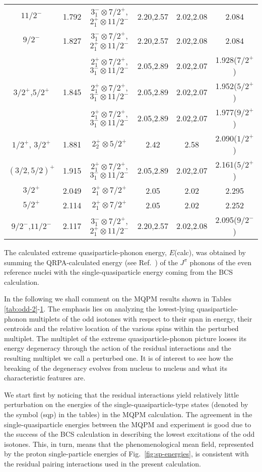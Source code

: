 \begin{table}[htbp]
\begin{center}
\begin{tabular}{cc|ccc|c}
$11/2^{-}$ & 1.792 & $3^-_1\otimes 7/2^+$, $2^+_1\otimes 11/2^-$ 
& 2.20,2.57 & 2.02,2.08 & 2.084 \\
$9/2^{-}$ & 1.827 & $3^-_1\otimes 7/2^+$, $2^+_1\otimes 11/2^-$ 
& 2.20,2.57 & 2.02,2.08 & 2.084 \\
& & $2^+_1\otimes 7/2^+$, $3^-_1\otimes 11/2^-$ 
& 2.05,2.89 & 2.02,2.07 & 1.928($7/2^+$) \\
$3/2^{+}$,$5/2^{+}$ & 1.845 & $2^+_1\otimes 7/2^+$, $3^-_1\otimes 11/2^-$ 
& 2.05,2.89 & 2.02,2.07 & 1.952($5/2^+$) \\
& & $2^+_1\otimes 7/2^+$, $3^-_1\otimes 11/2^-$ 
& 2.05,2.89 & 2.02,2.07 & 1.977($9/2^+$) \\
$1/2^{+}$, $3/2^{+}$ & 1.881 & $2^+_2\otimes 5/2^+$ & 2.42 & 2.58 & 
2.090($1/2^+$) \\
$(3/2,5/2)^{+}$ & 1.915 & $2^+_1\otimes 7/2^+$, $3^-_1\otimes 11/2^-$ 
& 2.05,2.89 & 2.02,2.07 & 2.161($5/2^+$) \\
$3/2^{+}$ & 2.049 & $2^+_1\otimes 7/2^+$ & 2.05 & 2.02 & 2.295 \\
$5/2^{+}$ & 2.114 & $2^+_1\otimes 7/2^+$ & 2.05 & 2.02 & 2.252 \\
$9/2^{-}$,$11/2^{-}$ & 2.117 & $3^-_1\otimes 7/2^+$, $2^+_1\otimes 11/2^-$ 
& 2.20,2.57 & 2.02,2.08 & 2.095($9/2^-$) \\
\hline
\end{tabular}
\label{tab:odd-7}
\end{center}
\end{table}
The calculated extreme quasiparticle-phonon energy, $E$(calc), 
was obtained
by summing the QRPA-calculated energy (see Ref.\ \cite{HOL97}) 
of the $J^{\pi}$ phonons of the even reference nuclei 
with the single-quasiparticle
energy coming from the BCS calculation.

In the following we shall comment on the MQPM results 
shown in Tables \ref{tab:odd-2}-\ref{tab:odd-7}.
The emphasis lies on analyzing
the lowest-lying quasiparticle-phonon multiplets of the odd isotones
with respect to their span in energy, their 
centroids and the relative
location of the various spins within the perturbed multiplet. 
The multiplet of the extreme quasiparticle-phonon 
picture looses its energy degeneracy through the 
action of the residual interactions and 
the resulting multiplet we call a perturbed one. It is of interest
to see how the breaking of the degeneracy evolves 
from nucleus to nucleus
and what its characteristic features are.

We start first by noticing that the residual 
interactions yield relatively
little perturbation on the energies of the 
single-quasiparticle-type states 
(denoted by the symbol (sqp) in the tables) in the MQPM calculation. 
The agreement in the single-quasiparticle energies
between the MQPM and experiment is good 
due to the success of the  BCS 
calculation in describing the lowest excitations of the odd isotones.
This, in turn, means that the 
phenomenological mean field, represented by
the proton single-particle energies of Fig.\ \ref{fig:sp-energies}, 
is consistent with the
residual pairing interactions used in the present calculation.

